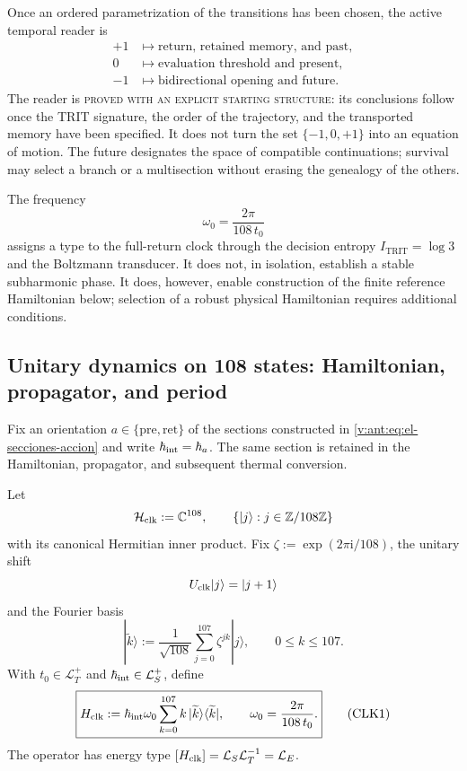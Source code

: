 Once an ordered parametrization of the transitions has been chosen, the active
temporal reader is
\[
\begin{aligned}
 +1&\longmapsto
 \text{return, retained memory, and past},\\
 0&\longmapsto
 \text{evaluation threshold and present},\\
 -1&\longmapsto
 \text{bidirectional opening and future}.
\end{aligned}
\]
The reader is \textsc{proved with an explicit starting structure}: its
conclusions follow once the TRIT signature, the order of the
trajectory, and the transported memory have been specified. It does not turn the set
\(\{-1,0,+1\}\) into an equation of motion. The future designates the space
of compatible continuations; survival may select a branch
or a multisection without erasing the genealogy of the others.

The frequency
\[
 \omega_0=\frac{2\pi}{108\,t_0}
\]
assigns a type to the full-return clock through the decision entropy
\(I_{\mathrm{TRIT}}=\log 3\) and the Boltzmann transducer.
It does not, in isolation, establish a stable subharmonic phase. It does, however, enable construction of
the finite reference Hamiltonian below; selection of a robust physical
Hamiltonian requires additional conditions.

\subsection{Unitary dynamics on 108 states: Hamiltonian, propagator, and period}
\label{v:rec:sec:hamiltoniano-reloj-108}

Fix an orientation \(a\in\{\mathrm{pre},\mathrm{ret}\}\) of the
sections constructed in \eqref{v:ant:eq:el-secciones-accion} and write
\(\hbar_{\rm int}=\hbar_a\). The same section is retained in the
Hamiltonian, propagator, and subsequent thermal conversion.

Let
\[
 \mathcal H_{\rm clk}:=\mathbb C^{108},
 \qquad
 \{|j\rangle:j\in\mathbb Z/108\mathbb Z\}
\]
with its canonical Hermitian inner product. Fix
\(\zeta:=\exp(2\pi\mathrm i/108)\), the unitary shift
\[
 U_{\rm clk}|j\rangle=|j+1\rangle
\]
and the Fourier basis
\[
 |\widetilde k\rangle
 :=\frac1{\sqrt{108}}\sum_{j=0}^{107}\zeta^{jk}|j\rangle,
 \qquad 0\leq k\leq107.
\]
With \(t_0\in\mathcal L_T^+\) and
\(\hbar_{\rm int}\in\mathcal L_S^+\), define
\[
 \boxed{
 H_{\rm clk}
 :=\hbar_{\rm int}\omega_0
 \sum_{k=0}^{107}k\,
 |\widetilde k\rangle\langle\widetilde k|,
 \qquad
 \omega_0=\frac{2\pi}{108\,t_0}.}
 \tag{CLK1}\label{v:rec:eq:hamiltoniano-reloj-108}
\]
The operator has energy type
\([H_{\rm clk}]=\mathcal L_S\mathcal L_T^{-1}=\mathcal L_E\).

